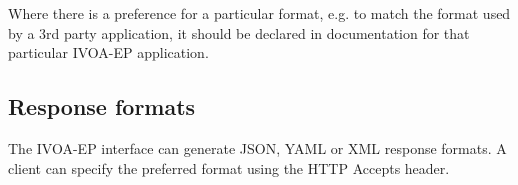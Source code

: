 \documentclass[11pt,a4paper]{ivoa}
\newcommand{\xml} {XML\xspace}
\newcommand{\json} {JSON\xspace}
\newcommand{\yaml} {YAML\xspace}
\newcommand{\ivoep} {IVOA-EP\xspace}
\begin{document}
Where there is a preference for a particular format, e.g. to match the format used by a 3rd party application, it should be declared in documentation for that particular \ivoep application.

\subsection{Response formats}
\label{sec:response-formats}
The \ivoep interface can generate \json, \yaml or \xml response formats.
A client can specify the preferred format using the HTTP Accepts header.



\end{document}
